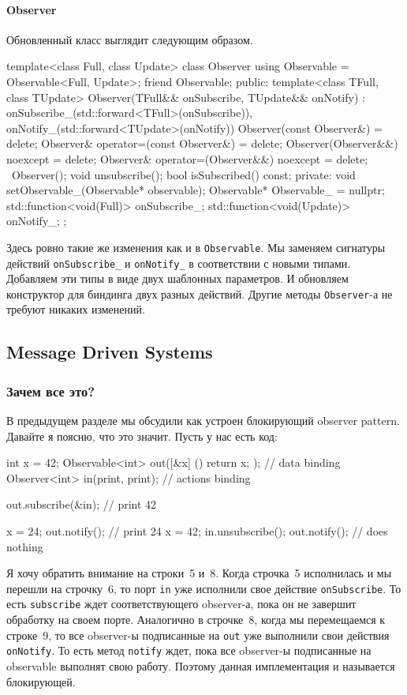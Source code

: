 \paragraph{Observer}

Обновленный класс выглядит следующим образом.
\begin{cppcode}
template<class Full, class Update>
class Observer {
  using Observable = Observable<Full, Update>;
  friend Observable;
public:
  template<class TFull, class TUpdate>
  Observer(TFull&& onSubscribe, TUpdate&& onNotify)
    : onSubscribe_(std::forward<TFull>(onSubscribe)),
      onNotify_(std::forward<TUpdate>(onNotify)) {}
  Observer(const Observer&) = delete;
  Observer& operator=(const Observer&) = delete;
  Observer(Observer&&) noexcept = delete;
  Observer& operator=(Observer&&) noexcept = delete;
  ~Observer();
  void unsubscribe();
  bool isSubscribed() const;
private:
  void setObservable_(Observable* observable);
  Observable* Observable_ = nullptr;
  std::function<void(Full)> onSubscribe_;
  std::function<void(Update)> onNotify_;
};
\end{cppcode}
Здесь ровно такие же изменения как и в \verb"Observable".
Мы заменяем сигнатуры действий \verb"onSubscribe_" и \verb"onNotify_" в соответствии с новыми типами.
Добавляем эти типы в виде двух шаблонных параметров.
И обновляем конструктор для биндинга двух разных действий.
Другие методы \verb"Observer"-а не требуют никаких изменений.

\subsection{Message Driven Systems}
\label{section::MDS}

\subsubsection{Зачем все это?}

В предыдущем разделе мы обсудили как устроен блокирующий observer pattern.
Давайте я поясню, что это значит.
Пусть у нас есть код:
\begin{cppcode}
int x = 42;
Observable<int> out([&x] () { return x; }); // data binding
Observer<int> in(print, print); // actions binding
  
out.subscribe(&in); // print 42
  
x = 24;
out.notify();  // print 24
x = 42;
in.unsubscribe();
out.notify(); // does nothing
\end{cppcode}
Я хочу обратить внимание на строки~5 и~8.
Когда строчка~5 исполнилась и мы перешли на строчку~6, то порт \verb"in" уже исполнили свое действие \verb"onSubscribe".
То есть \verb"subscribe" ждет соответствующего observer-а, пока он не завершит обработку на своем порте.
Аналогично в строчке~8, когда мы перемещаемся к строке~9, то все observer-ы подписанные на \verb"out" уже выполнили свои действия \verb"onNotify".
То есть метод \verb"notify" ждет, пока все observer-ы подписанные на observable выполнят свою работу.
Поэтому данная имплементация и называется блокирующей.

